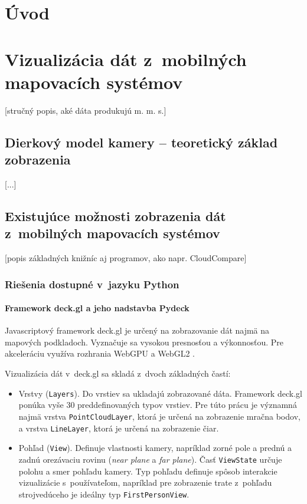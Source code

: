 %

\chapter{Úvod}

\chapter{Vizualizácia dát z~mobilných mapovacích systémov}

[stručný popis, aké dáta produkujú m. m. s.]

\section{Dierkový model kamery -- teoretický základ zobrazenia}

[...]

\section{Existujúce možnosti zobrazenia dát z~mobilných mapovacích systémov}

[popis základných knižníc aj programov, ako napr. CloudCompare]

\subsection{Riešenia dostupné v~jazyku Python}

\subsubsection{Framework deck.gl a jeho nadstavba Pydeck}
\label{sec:deck_gl}

Javascriptový framework deck.gl je určený na zobrazovanie dát najmä na mapových podkladoch. Vyznačuje sa vysokou presnosťou a výkonnosťou. Pre akceleráciu využíva rozhrania WebGPU a WebGL2 \cite{deck.gl_documentation}.

Vizualizácia dát v~deck.gl sa skladá z~dvoch základných častí:
\begin{itemize}
    \item Vrstvy (\texttt{Layers}). Do vrstiev sa ukladajú zobrazované dáta. Framework deck.gl ponúka vyše 30 preddefinovaných typov vrstiev. Pre túto prácu je významná najmä vrstva \texttt{PointCloudLayer}, ktorá je určená na zobrazenie mračna bodov, a vrstva \texttt{LineLayer}, ktorá je určená na zobrazenie čiar.
    \item Pohľad (\texttt{View}). Definuje vlastnosti kamery, napríklad zorné pole a prednú a zadnú orezávaciu rovinu (\emph{near plane} a \emph{far plane}).
    Časť \texttt{ViewState} určuje polohu a smer pohľadu kamery. Typ pohľadu definuje spôsob interakcie vizualizácie s~používateľom, napríklad pre zobrazenie trate z~pohľadu strojvedúceho je ideálny typ \texttt{FirstPersonView}.
\end{itemize}

